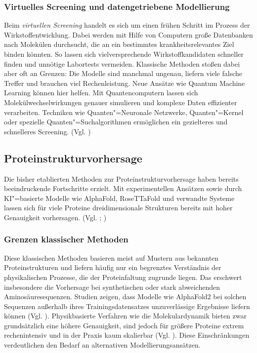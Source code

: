 \subsubsection*{Virtuelles Screening und datengetriebene Modellierung}
Beim \textit{virtuellen Screening} handelt es sich um einen frühen Schritt im Prozess der Wirkstoffentwicklung. Dabei werden mit Hilfe von Computern große Datenbanken nach Molekülen durchsucht, die an ein bestimmtes krankheitsrelevantes Ziel binden könnten. So lassen sich vielversprechende Wirkstoffkandidaten schneller finden und unnötige Labortests vermeiden. Klassische Methoden stoßen dabei aber oft an Grenzen: Die Modelle sind manchmal ungenau, liefern viele falsche Treffer und brauchen viel Rechenleistung. Neue Ansätze wie Quantum Machine Learning können hier helfen. Mit Quantencomputern lassen sich Molekülwechselwirkungen genauer simulieren und komplexe Daten effizienter verarbeiten. Techniken wie Quanten"=Neuronale Netzwerke, Quanten"=Kernel oder spezielle Quanten"=Suchalgorithmen ermöglichen ein gezielteres und schnelleres Screening. (Vgl. \cite{kumar_recent_2024})


\subsection{Proteinstrukturvorhersage}
\label{med:protein}
Die bisher etablierten Methoden zur Proteinstrukturvorhersage haben bereits beeindruckende Fortschritte erzielt. Mit experimentellen Ansätzen sowie durch KI"=basierte Modelle wie AlphaFold, RoseTTaFold und verwandte Systeme lassen sich für viele Proteine dreidimensionale Strukturen bereits mit hoher Genauigkeit vorhersagen. (Vgl. \cite{jumperHighlyAccurateProtein2021}; \cite{baekAccuratePredictionProtein2021})

\subsubsection*{Grenzen klassischer Methoden}
Diese klassischen Methoden basieren meist auf Mustern aus bekannten Proteinstrukturen und liefern häufig nur ein begrenztes Verständnis der physikalischen Prozesse, die der Proteinfaltung zugrunde liegen. Das erschwert insbesondere die Vorhersage bei synthetischen oder stark abweichenden Aminosäuresequenzen. Studien zeigen, dass Modelle wie AlphaFold2 bei solchen Sequenzen außerhalb ihres Trainingsdatensatzes unzuverlässige Ergebnisse liefern können (Vgl. \cite{outeiralCurrentStructurePredictors2022}). Physikbasierte Verfahren wie die Molekulardynamik bieten zwar grundsätzlich eine höhere Genauigkeit, sind jedoch für größere Proteine extrem rechenintensiv und in der Praxis kaum skalierbar (Vgl. \cite{doga_perspective_2024}). Diese Einschränkungen verdeutlichen den Bedarf an alternativen Modellierungsansätzen.

